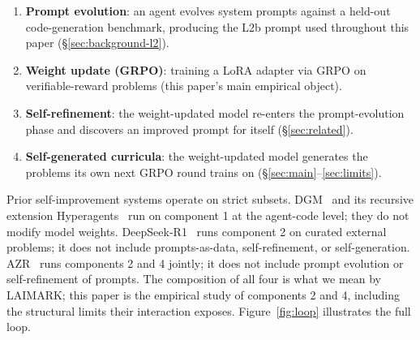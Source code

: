 \documentclass[11pt,a4paper]{article}
\begin{document}
\begin{enumerate}
    \item \textbf{Prompt evolution}: an agent evolves system prompts against a held-out code-generation benchmark, producing the L2b prompt used throughout this paper (\S\ref{sec:background-l2}).
    \item \textbf{Weight update (GRPO)}: training a LoRA adapter via GRPO on verifiable-reward problems (this paper's main empirical object).
    \item \textbf{Self-refinement}: the weight-updated model re-enters the prompt-evolution phase and discovers an improved prompt for itself (\S\ref{sec:related}).
    \item \textbf{Self-generated curricula}: the weight-updated model generates the problems its own next GRPO round trains on (\S\ref{sec:main}--\ref{sec:limits}).
\end{enumerate}

Prior self-improvement systems operate on strict subsets.
DGM~\citep{zhang2025dgm} and its recursive extension Hyperagents~\citep{zhang2026hyperagents} run on component 1 at the agent-code level; they do not modify model weights.
DeepSeek-R1~\citep{deepseek2025r1} runs component 2 on curated external problems; it does not include prompts-as-data, self-refinement, or self-generation.
AZR~\citep{zhao2025azr} runs components 2 and 4 jointly; it does not include prompt evolution or self-refinement of prompts.
The composition of all four is what we mean by LAIMARK; this paper is the empirical study of components 2 and 4, including the structural limits their interaction exposes.
Figure~\ref{fig:loop} illustrates the full loop.
\end{document}
